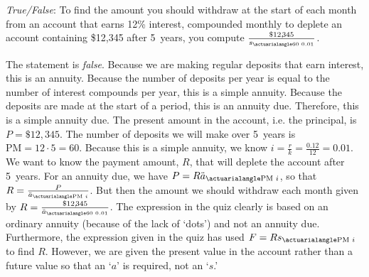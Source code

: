\documentclass[11pt,letterpaper]{article}
\begin{document}
\quizsol \textit{True/False}: To find the amount you should withdraw at the start of each month from an account that earns 12\% interest, compounded monthly to deplete an account containing \$12,345 after 5~years, you compute $\frac{\$12,\!345}{\actS{60}{0.01}}$. \pspace

\sol The statement is \textit{false}. Because we are making regular deposits that earn interest, this is an annuity. Because the number of deposits per year is equal to the number of interest compounds per year, this is a simple annuity. Because the deposits are made at the start of a period, this is an annuity due. Therefore, this is a simple annuity due. The present amount in the account, i.e. the principal, is $P= \$12,\!345$. The number of deposits we will make over 5~years is $\text{PM}= 12 \cdot 5= 60$. Because this is a simple annuity, we know $i= \frac{r}{k}= \frac{0.12}{12}= 0.01$. We want to know the payment amount, $R$, that will deplete the account after 5~years. For an annuity due, we have $P= R \actAD{\text{PM}}{i}$, so that $R= \frac{P}{\actAD{\text{PM}}{i}}$. But then the amount we should withdraw each month given by $R= \frac{\$12,\!345}{\actAD{60}{0.01}}$. The expression in the quiz clearly is based on an ordinary annuity (because of the lack of `dots') and not an annuity due. Furthermore, the expression given in the quiz has used $F= R \actS{\text{PM}}{i}$ to find $R$. However, we are given the present value in the account rather than a future value so that an `$a$' is required, not an `$s$.' 
\end{document}
